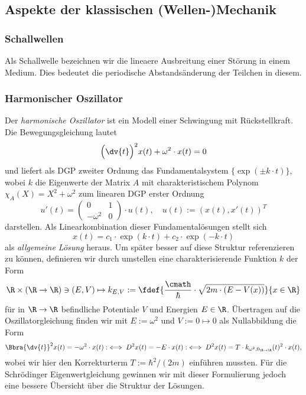 \documentclass[../main.tex]{subfiles}
\begin{document}
    \subsection{Aspekte der klassischen (Wellen-)Mechanik}
        \subsubsection{Schallwellen}
            Als Schallwelle bezeichnen wir die lineaere Ausbreitung einer Störung in einem Medium. Dies bedeutet die periodische Abstandsänderung der Teilchen in diesem. 

        \subsubsection{Harmonischer Oszillator}
            Der \emph{harmonische Oszillator} ist ein Modell einer Schwingung mit Rückstellkraft. Die Bewegungsgleichung lautet
            \[
                \Bigl(\dv{t}\Bigr)^2x(t) + \omega^2\cdot x(t) = 0
            \]
            und liefert als DGP zweiter Ordnung das Fundamentalsystem $\{\exp(\pm k\cdot t)\}$, wobei $k$ die Eigenwerte der Matrix $A$ mit charakteristischem Polynom $\chi_A(X) = X^2 + \omega^2$ zum linearen DGP erster Ordnung
            \[
                u'(t) = \begin{pmatrix}
                    0 & 1\\
                    -\omega^2 & 0
                \end{pmatrix}\cdot u(t),\quad u(t):=(x(t), x'(t))^T
            \]
            darstellen. Als Linearkombination dieser Fundamentalösungen stellt sich 
            \[
                x(t) = c_1\cdot\exp(k\cdot t) + c_2\cdot\exp(-k\cdot t)   
            \]
            als \emph{allgemeine Lösung} heraus. Um später besser auf diese Struktur referenzieren zu können, definieren wir durch umstellen eine charakterisierende Funktion $k$ der Form
            \[
                \R\times(\R\to\R)\ni(E,V)\mapsto k_{E,V}:=\fdef{\frac{\cmath}{\hbar}\cdot\sqrt{2m\cdot(E - V(x))}}{x\in\R}
            \] 
            für in $\R\to\R$ befindliche Potentiale $V$ und Energien $E\in\R$. Übertragen auf die Oszillatorgleichung finden wir mit $E:=\omega^2$ und $V:=0\mapsto 0$ als Nullabbildung die Form
            \[
                \Bbra{\dv{t}}^2x(t) = -\omega^2\cdot x(t) :\iff D^2x(t) = -E\cdot x(t) :\iff D^2x(t) = T\cdot k_{\omega^2,0_{\R\to\R}}(t)^2\cdot x(t),
            \]
            wobei wir hier den Korrekturterm $T:=\hbar^2/(2m)$ einführen mussten. Für die Schrödinger Eigenwertgleichung gewinnen wir mit dieser Formulierung jedoch eine bessere Übersicht über die Struktur der Lösungen.
\end{document}
